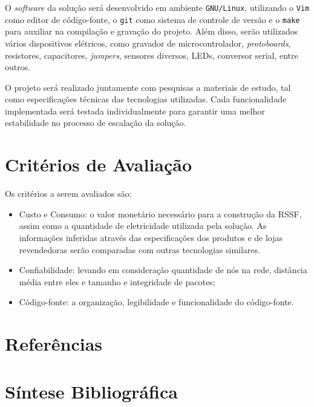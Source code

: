 \documentclass[
    12pt,               %
    a4paper,            %
    english,            %
    brazil,             %
    ]{article}
\begin{document}
O \textit{software} da solução será desenvolvido em ambiente \texttt{GNU/Linux}, utilizando o \texttt{Vim} como editor de
código-fonte, o \texttt{git} como sistema de controle de versão e o \texttt{make} para auxiliar na compilação e gravação do
projeto. Além disso, serão utilizados vários dispositivos elétricos, como gravador de microcontrolador, \textit{protoboards},
resistores, capacitores, \textit{jumpers}, sensores diversos, LEDs, conversor serial, entre outros.

O projeto será realizado juntamente com pesquisas a materiais de estudo, tal como especificações técnicas das tecnologias
utilizadas. Cada funcionalidade implementada será testada individualmente para garantir uma melhor estabilidade no processo de
escalação da solução.


\section{Critérios de Avaliação}

Os critérios a serem avaliados são:
\begin{itemize}
	\item Custo e Consumo: o valor monetário necessário para a construção da RSSF, assim como a quantidade de eletricidade
	utilizada pela solução. As informações inferidas através das especificações dos produtos e de lojas revendedoras serão
	comparadas com outras tecnologias similares.
	\item Confiabilidade: levando em consideração quantidade de nós na rede, distância média entre eles e tamanho e integridade de pacotes;
	\item Código-fonte: a organização, legibilidade e funcionalidade do código-fonte.
\end{itemize}


\newpage
\section{Referências}
    \vspace{-4.3em}
    \renewcommand\refname{}
    

\section{Síntese Bibliográfica}


\end{document}
